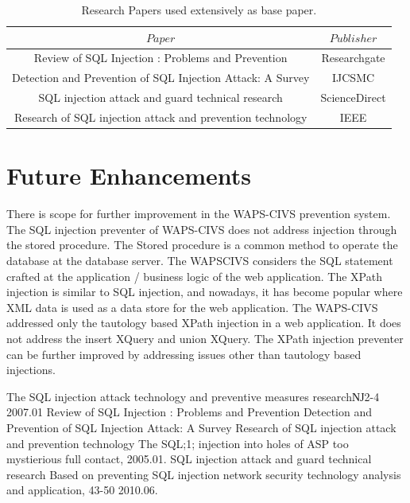 \documentclass[letterpaper,12pt]{article}
\begin{document}
\begin{table}[ht]
\begin{center}
\caption{Research Papers used extensively as base paper.}
\label{tbl:bins} %
\begin{tabular}{|cc|} 
\hline
\multicolumn{1}{|c}{$Paper$ } & \multicolumn{1}{c|}{$Publisher$ } \\
\hline
Review of SQL Injection : Problems and Prevention &   Researchgate \\
Detection and Prevention of SQL
Injection Attack: A Survey &   IJCSMC \\
SQL injection attack and guard technical research &   ScienceDirect \\
Research of SQL injection attack and prevention technology &   IEEE \\
\hline
\end{tabular}
\end{center}
\end{table}


\section{Future Enhancements}
There is scope for further improvement in the WAPS-CIVS
prevention system. The SQL injection preventer of WAPS-CIVS does not
address injection through the stored procedure. The Stored procedure is a
common method to operate the database at the database server. The WAPSCIVS considers the SQL statement crafted at the application / business logic
of the web application.
The XPath injection is similar to SQL injection, and nowadays, it
has become popular where XML data is used as a data store for the web
application. The WAPS-CIVS addressed only the tautology based XPath
injection in a web application. It does not address the insert XQuery and
union XQuery. The XPath injection preventer can be further improved by
addressing issues other than tautology based injections. 



\begin{thebibliography}{99}

The SQL injection attack technology and preventive measures researchǊ2-4 2007.01 
 Review of SQL Injection :  Problems and Prevention
 Detection and Prevention of SQL Injection Attack:  A Survey
Research of SQL injection attack and prevention technology
The SQL;1; injection into holes of ASP too mystierious full contact, 2005.01.
SQL injection attack and guard technical research
Based on preventing SQL injection network security technology analysis and application, 43-50 2010.06.
\end{thebibliography}
\end{document}
